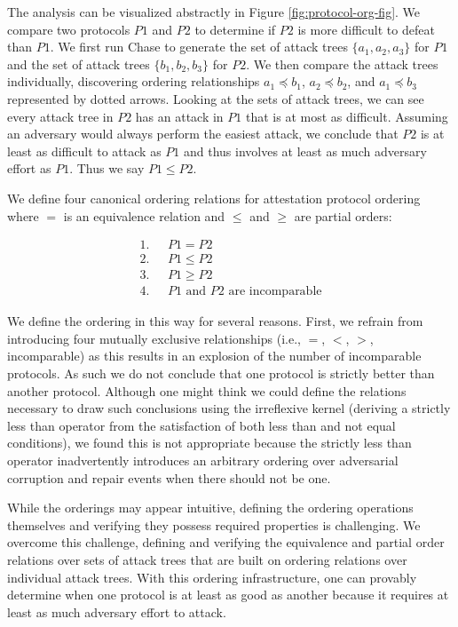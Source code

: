 \documentclass[runningheads]{llncs}
\theoremstyle{definition}
\begin{document}
The analysis can be visualized abstractly in Figure
\ref{fig:protocol-org-fig}.  We compare two protocols $P1$ and $P2$ to
determine if $P2$ is more difficult to defeat than $P1$. We first run
Chase to generate the set of attack trees $\{ a_1, a_2, a_3\}$ for
$P1$ and the set of attack trees $\{b_1, b_2, b_3\}$ for $P2$. We then
compare the attack trees individually, discovering ordering
relationships $a_1 \preceq b_1$, $a_2 \preceq b_2$, and
$a_1 \preceq b_3$ represented by dotted arrows. Looking at the sets of
attack trees, we can see every attack tree in $P2$ has an attack in
$P1$ that is at most as difficult. Assuming an adversary would always
perform the easiest attack, we conclude that $P2$ is at least as
difficult to attack as $P1$ and thus involves at least as much
adversary effort as $P1$. Thus we say $P1 \leq P2$.

We define four canonical ordering relations for attestation
protocol ordering where $=$ is an equivalence relation and $\le$ and
$\ge$ are partial orders:

\vspace*{-5mm}

\begin{align*}
1. & \text{ } P1 = P2 \\
2. & \text{ } P1 \le P2 \\
3. & \text{ } P1 \ge P2 \\
4. & \text{ } P1 \text{ and } P2 \text{ are incomparable}
\end{align*}

\noindent We define the ordering in this way for several
reasons. First, we refrain from introducing four mutually exclusive
relationships (i.e., $=$, $<$, $>$, incomparable) as this results in
an explosion of the number of incomparable protocols. As such we do
not conclude that one protocol is strictly better than another
protocol. Although one might think we could define the relations
necessary to draw such conclusions using the irreflexive kernel
(deriving a strictly less than operator from the satisfaction of both
less than and not equal conditions), we found this is not appropriate
because the strictly less than operator inadvertently introduces
an arbitrary ordering over adversarial corruption and repair events
when there should not be one.

While the orderings may appear intuitive, defining the ordering
operations themselves and verifying they possess required properties is
challenging. We overcome this challenge, defining and
verifying the equivalence and partial order relations over sets of
attack trees that are built on ordering relations over individual
attack trees. With this ordering infrastructure, one can provably
determine when one protocol is at least as good as another because it
requires at least as much adversary effort to attack.
\end{document}
